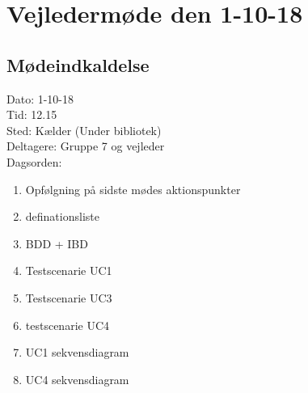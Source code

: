 \section{Vejledermøde den 1-10-18}
\subsection{Mødeindkaldelse}
Dato: 1-10-18
\\Tid: 12.15
\\Sted: Kælder (Under bibliotek)
\\Deltagere: Gruppe 7 og vejleder
\\Dagsorden:
\begin{enumerate}
    \item Opfølgning på sidste mødes aktionspunkter 
    \item  definationsliste 
    \item  BDD + IBD 
    \item  Testscenarie UC1
    \item  Testscenarie UC3
    \item  testscenarie UC4 
    \item  UC1 sekvensdiagram
    \item  UC4 sekvensdiagram
  
\end{enumerate}
 
